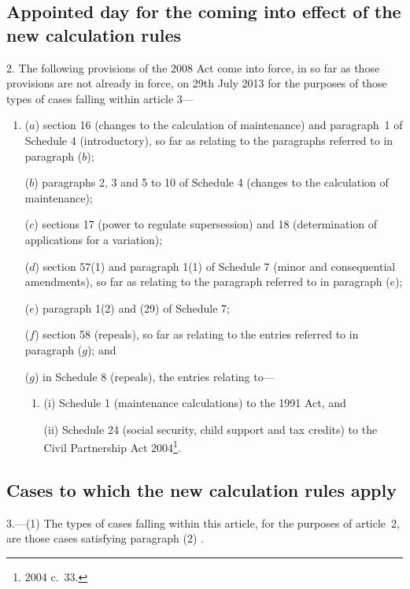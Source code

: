 \documentclass[12pt,a4paper]{article}
\begin{document}
\subsection[2. Appointed day for the coming into effect of the new calculation rules]{Appointed day for the coming into effect of the new calculation rules}

2.  The following provisions of the 2008 Act come into force, in so far as those provisions are not already in force, on 29th July 2013 for the purposes of those types of cases falling within article 3—
\begin{enumerate}\item[]
($a$) section 16 (changes to the calculation of maintenance) and paragraph~1 of Schedule 4 (introductory), so far as relating to the paragraphs referred to in paragraph ($b$);

($b$) paragraphs 2, 3 and 5 to 10 of Schedule 4 (changes to the calculation of maintenance);

($c$) sections 17 (power to regulate supersession) and 18 (determination of applications for a variation);

($d$) section 57(1) and paragraph 1(1) of Schedule 7 (minor and consequential amendments), so far as relating to the paragraph referred to in paragraph ($e$);

($e$) paragraph 1(2) and (29) of Schedule 7;

($f$) section 58 (repeals), so far as relating to the entries referred to in paragraph ($g$); and

($g$) in Schedule 8 (repeals), the entries relating to—
\begin{enumerate}\item[]
(i) Schedule 1 (maintenance calculations) to the 1991 Act, and

(ii) Schedule 24 (social security, child support and tax credits) to the Civil Partnership Act 2004\footnote{2004 c.~33.}.
\end{enumerate}
\end{enumerate}

\subsection[3. Cases to which the new calculation rules apply]{Cases to which the new calculation rules apply}

3.---(1)  The types of cases falling within this article, for the purposes of article~2, are those cases satisfying 
paragraph (2)%
.
\end{document}
